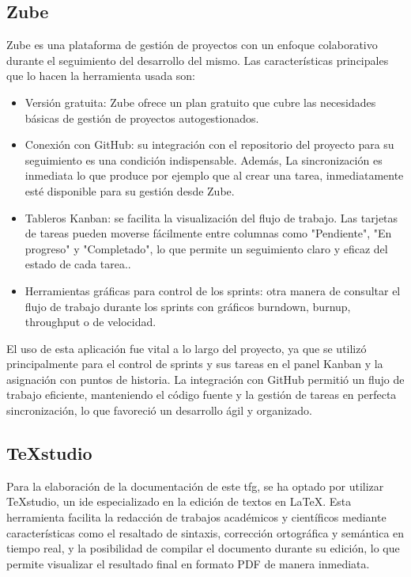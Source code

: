 	\subsection{Zube}
	Zube es una plataforma de gestión de proyectos con un enfoque colaborativo durante el seguimiento del desarrollo del mismo. Las características principales que lo hacen la herramienta usada son:
	\begin{itemize}
		
		\item Versión gratuita: Zube ofrece un plan gratuito que cubre las necesidades básicas de gestión de proyectos autogestionados.
		
		\item Conexión con GitHub: su integración con el repositorio del proyecto para su seguimiento es una condición indispensable. Además, La sincronización es inmediata lo que produce por ejemplo que al crear una tarea, inmediatamente esté disponible para su gestión desde Zube.
		
		\item Tableros Kanban: se facilita la visualización del flujo de trabajo. Las tarjetas de tareas pueden moverse fácilmente entre columnas como "Pendiente", "En progreso" y "Completado", lo que permite un seguimiento claro y eficaz del estado de cada tarea..
		
		\item Herramientas gráficas para control de los sprints: otra manera de consultar el flujo de trabajo durante los sprints con gráficos burndown, burnup, throughput o de velocidad.
	 
	\end{itemize}
	
	El uso de esta aplicación fue vital a lo largo del proyecto, ya que se utilizó principalmente para el control de sprints y sus tareas en el panel Kanban y la asignación con puntos de historia. La integración con GitHub permitió un flujo de trabajo eficiente, manteniendo el código fuente y la gestión de tareas en perfecta sincronización, lo que favoreció un desarrollo ágil y organizado. 
	
	\subsection{TeXstudio}
	Para la elaboración de la documentación de este \acrshort{tfg}, se ha optado por utilizar TeXstudio, un \acrfull{ide} especializado en la edición de textos en LaTeX. Esta herramienta facilita la redacción de trabajos académicos y científicos mediante características como el resaltado de sintaxis, corrección ortográfica y semántica en tiempo real, y la posibilidad de compilar el documento durante su edición, lo que permite visualizar el resultado final en formato PDF de manera inmediata.
	
